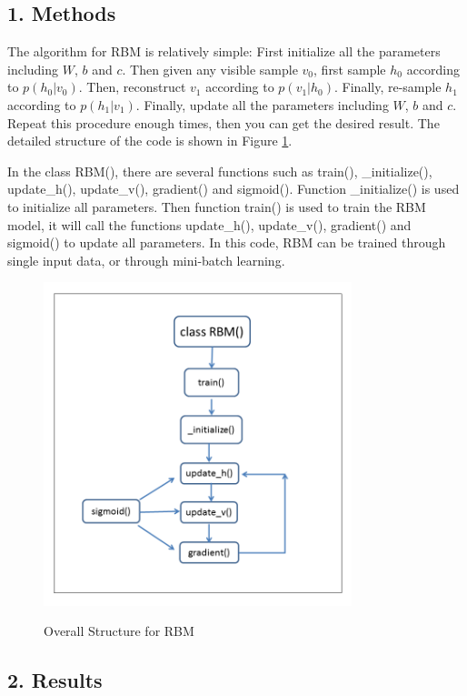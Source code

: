 \subsection*{\large 1. Methods}

The algorithm for RBM is relatively simple: First initialize all the parameters including $W$, $b$ and $c$. Then given any visible sample $v_0$,  first sample $h_0$ according to $p(h_0|v_0)$. Then, reconstruct $v_1$ according to $p(v_1|h_0)$. Finally, re-sample $h_1$ according to $p(h_1|v_1)$. Finally, update all the parameters including $W$, $b$ and $c$. Repeat this procedure enough times, then you can get the desired result. The detailed structure of the code is shown in Figure \ref{fig:structure}. 

In the class RBM(), there are several functions such as train(), \_initialize(), update\_h(), update\_v(), gradient() and sigmoid(). Function \_initialize() is used to initialize all parameters. Then function train() is used to train the RBM model, it will call the functions update\_h(), update\_v(), gradient() and sigmoid() to update all parameters. In this code, RBM can be trained through single input data, or through mini-batch learning.

\begin{figure}[H]
\centering
\includegraphics[width=0.8\textwidth]{./figures/ECE544hw4.png}\
\caption{\label{fig:structure} Overall Structure for RBM}
\end{figure}

\subsection*{\large 2. Results}


